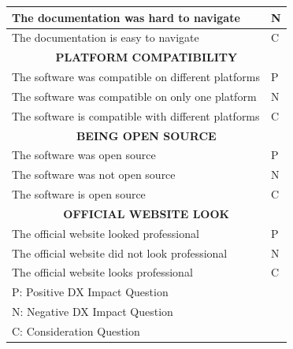 \documentclass{cslthse-msc}
\begin{document}
\begin{table}[H]
\begin{tabularx}{\columnwidth}{X|l}
        The documentation was hard to navigate	&	N		\\ \hline
        The documentation is easy to navigate	&	C		\\ \hline \hline
        \multicolumn{2}{c}{\textbf{	PLATFORM COMPATIBILITY	}} \\ \hline
        The software was compatible on different platforms	&	P		\\ \hline
        The software was compatible on only one platform	&	N		\\ \hline
        The software is compatible with different platforms	&	C		\\ \hline \hline
        \multicolumn{2}{c}{\textbf{	BEING OPEN SOURCE	}} \\ \hline
        The software was open source	&	P		\\ \hline
        The software was not open source	&	N		\\ \hline
        The software is open source	&	C		\\ \hline \hline
        \multicolumn{2}{c}{\textbf{	OFFICIAL WEBSITE LOOK	}} \\ \hline
        The official website looked professional	&	P		\\ \hline
        The official website did not look professional	&	N		\\ \hline
        The official website looks professional	&	C		\\\hline \hline
        \multicolumn{2}{l}{P: Positive DX Impact Question} \\
        \multicolumn{2}{l}{N: Negative DX Impact Question} \\
        \multicolumn{2}{l}{C: Consideration Question}

        \end{tabularx}
    \end{table}
\end{document}
